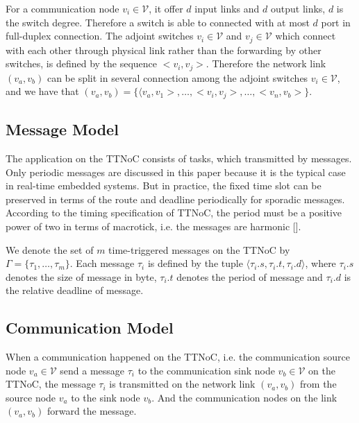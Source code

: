 \documentclass[conference]{IEEEtran}
\begin{document}
For a communication node $ \mathit{v}_{i}\in\mathcal{V} $, it offer $\mathit{d}$ input links and $\mathit{d}$ output links, $\mathit{d}$ is the switch degree. Therefore a switch is able to connected with at most $ \mathit{d} $ port in full-duplex connection. The adjoint switches $v_{i}\in\mathcal{V}$ and $v_{j}\in\mathcal{V}$ which connect with each other through physical link rather than the forwarding by other switches, is defined by the sequence $ <v_{i},v_{j}> $. Therefore the network link $(v_{a},v_{b})$ can be split in several connection among the adjoint switches  $v_{i}\in\mathcal{V}$, and we have that 
$ (v_{a},v_{b})=\{ \langle v_{a},v_{1}> ,\dots, <v_{i},v_{j}> ,\dots, <v_{n},v_{b}> \} $.

\subsection{Message Model}

The application on the TTNoC consists of tasks, which transmitted by messages. Only periodic messages are discussed in this paper because it is the typical case in real-time embedded systems. But in practice, the fixed time slot can be preserved in terms of the route and deadline periodically for sporadic messages. According to the timing specification of TTNoC, the period must be a positive power of two in terms of macrotick, i.e. the messages are harmonic [].

We denote the set of $ \mathit{m} $ time-triggered messages on the TTNoC by $\Gamma = \{\tau_{1},\dots,\tau_{m} \}$. Each message $\tau_{i}$ is defined by the tuple $\langle \tau_{i}.s, \tau_{i}.t, \tau_{i}.d\rangle$, where $\tau_{i}.s$ denotes the size of message in byte, $\tau_{i}.t$ denotes the period of message and $\tau_{i}.d$ is the relative deadline of message.

\subsection{Communication Model}

When a communication happened on the TTNoC, i.e. the communication source node $v_{a}\in \mathcal{V}$ send a message $\tau_{i}$ to the communication sink node $v_{b}\in \mathcal{V}$ on the TTNoC, the message $\tau_{i}$ is transmitted on the network link $(v_{a},v_{b})$ from the source node $v_{a}$ to the sink node $v_{b}$. And the communication nodes on the link $(v_{a},v_{b})$ forward the message.
\end{document}
